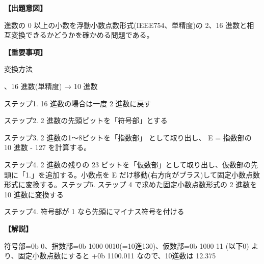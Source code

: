 \noindent \textbf{【出題意図】}

 進数の 0 以上の小数を浮動小数点数形式(IEEE754、単精度)の 2、16 進数と相互変換できるかどうかを確かめる問題である。

\vspace{1em}
\noindent \textbf{【重要事項】}

\noindent 変換方法

\medskip
{}、16 進数(単精度) → 10 進数

\noindent ステップ1.  16 進数の場合は一度 2 進数に戻す

\noindent ステップ2.  2 進数の先頭ビットを「符号部」とする

\noindent ステップ3.  2 進数の1〜8ビットを「指数部」 として取り出し、 E = 指数部の 10 進数 - 127 を計算する。

\noindent ステップ4.  2 進数の残りの 23 ビットを「仮数部」として取り出し、仮数部の先頭に「1.」を追加する。小数点を E だけ移動(右方向がプラス)して固定小数点数形式に変換する。ステップ5.  ステップ 4 で求めた固定小数点数形式の 2 進数を 10 進数に変換する

\noindent ステップ4.  符号部が 1 なら先頭にマイナス符号を付ける 


\vspace{1em}
\noindent \textbf{【解説】}

\noindent 符号部=0b 0、指数部=0b 1000 0010(=10進130)、仮数部=0b 1000 11 (以下0) より、固定小数点数にすると  +0b 1100.011 なので、10進数は 12.375
